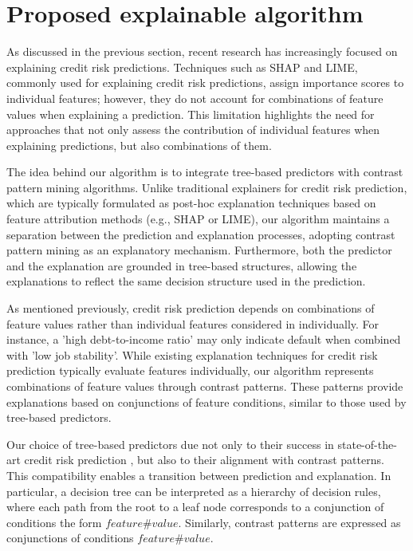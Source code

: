 \section{Proposed explainable algorithm}\label{sec:explainablealgorithm}
        As discussed in the previous section, recent research has increasingly focused on explaining credit risk predictions. Techniques such as SHAP and LIME, commonly used for explaining credit risk predictions, assign importance scores to individual features; however, they do not account for combinations of feature values when explaining a prediction. This limitation highlights the need for approaches that not only assess the contribution of individual features when explaining predictions, but also combinations of them.\\

    {\color{blue}
		    	The idea behind our algorithm is to integrate tree-based predictors with contrast pattern mining algorithms. Unlike traditional explainers for credit risk prediction, which are typically formulated as post-hoc explanation techniques based on feature attribution methods (e.g., SHAP or LIME), our algorithm maintains a separation between the prediction and explanation processes, adopting contrast pattern mining as an explanatory mechanism. Furthermore, both the predictor and the explanation are grounded in tree-based structures, allowing the explanations to reflect the same decision structure used in the prediction.\newline
		    	
		    	As mentioned previously, credit risk prediction depends on combinations of feature values rather than individual features considered in individually. For instance, a 'high debt-to-income ratio' may only indicate default when combined with 'low job stability'. While existing explanation techniques for credit risk prediction typically evaluate features individually, our algorithm represents combinations of feature values through contrast patterns. These patterns provide explanations based on conjunctions of feature conditions, similar to those used by tree-based predictors.\newline
		    	
		    	Our choice of tree-based predictors due not only to their success in state-of-the-art credit risk prediction \cite{aruleba2025improved}, but also to their alignment with contrast patterns. This compatibility enables a transition between prediction and explanation. In particular, a decision tree can be interpreted as a hierarchy of decision rules, where each path from the root to a leaf node corresponds to a conjunction of conditions the form $feature\#value$. Similarly, contrast patterns are expressed as conjunctions of conditions $feature\#value$.\newline
		    	
}
